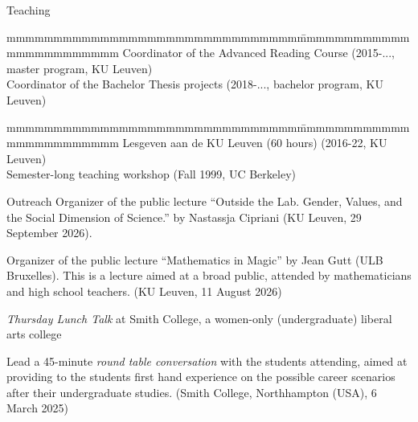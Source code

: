 \documentclass[12p]{resume}
\begin{document}
\begin{category}{Teaching}
\vspace*{-0.2cm}
\begin{tabbing}
mmmmmmmmmmmmmmmmmmmmmmmmmmmmmmm\= mmmmmmmmmmmmmmmmmmmmmmmm \kill
Coordinator of the Advanced Reading Course \>(2015-..., master program, KU Leuven)\\
Coordinator of the Bachelor Thesis projects \>(2018-..., bachelor program, KU Leuven)
\end{tabbing}


\vspace*{-0.2cm}
\begin{tabbing}
mmmmmmmmmmmmmmmmmmmmmmmmmmmmmmm\= mmmmmmmmmmmmmmmmmmmmmmmm \kill
Lesgeven aan de KU Leuven (60 hours) \>(2016-22, KU Leuven)\\
Semester-long teaching workshop \>(Fall 1999, UC Berkeley)
\end{tabbing}



\begin{category}{Outreach}
\citembullet Organizer of the public lecture ``Outside the Lab.
Gender, Values, and the Social Dimension of Science.'' by Nastassja Cipriani (KU Leuven, 29 September 2026). 

\citembullet Organizer of the public lecture ``Mathematics in Magic'' by  Jean Gutt (ULB  Bruxelles). This is a lecture aimed at a broad public, attended by mathematicians and high school teachers. (KU Leuven, 11 August 2026)



\citembullet
\emph{Thursday Lunch Talk} 
at Smith College, a women-only (undergraduate) liberal arts college

Lead a  45-minute \emph{round table conversation} with the students attending, aimed at providing to the students first hand experience on the possible career scenarios after their undergraduate studies. 
(Smith College,  Northhampton (USA), 6 March 2025)
  



 \end{category}


\end{category}
\end{document}
